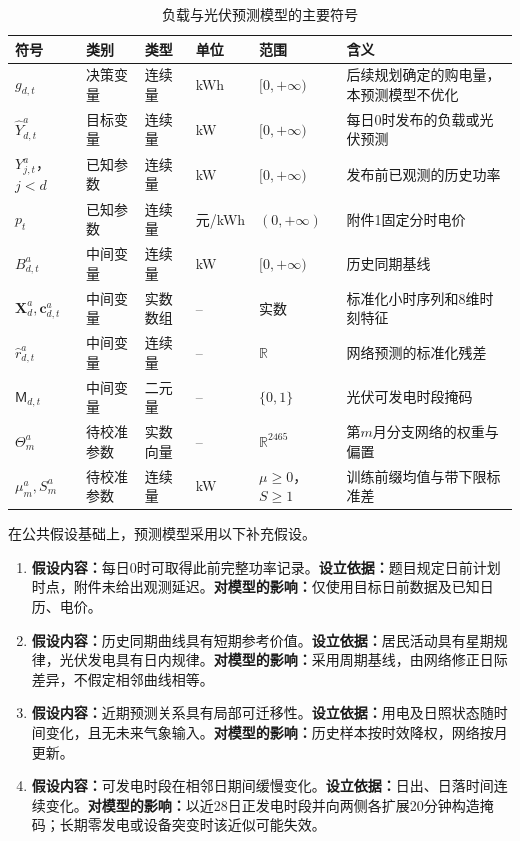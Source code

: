 \documentclass[withoutpreface,bwprint]{cumcmthesis}
\begin{document}
\begin{table}[H]
\centering\small
\caption{负载与光伏预测模型的主要符号}\label{tab:q2-pred-symbols}
\setlength{\tabcolsep}{3pt}
\renewcommand{\arraystretch}{1.12}
\begin{tabularx}{\textwidth}{p{2.3cm}p{1.65cm}p{1.45cm}p{1.1cm}p{1.8cm}X}
\toprule
符号 & 类别 & 类型 & 单位 & 范围 & 含义\\
\midrule
$g_{d,t}$ & 决策变量 & 连续量 & kWh & $[0,+\infty)$ & 后续规划确定的购电量，本预测模型不优化\\
$\widehat Y^a_{d,t}$ & 目标变量 & 连续量 & kW & $[0,+\infty)$ & 每日0时发布的负载或光伏预测\\
$Y^a_{j,t}$，$j<d$ & 已知参数 & 连续量 & kW & $[0,+\infty)$ & 发布前已观测的历史功率\\
$p_t$ & 已知参数 & 连续量 & 元/kWh & $(0,+\infty)$ & 附件1固定分时电价\\
$B^a_{d,t}$ & 中间变量 & 连续量 & kW & $[0,+\infty)$ & 历史同期基线\\
$\mathbf X_d^a,\mathbf c_{d,t}^a$ & 中间变量 & 实数数组 & -- & 实数 & 标准化小时序列和8维时刻特征\\
$\widehat r^a_{d,t}$ & 中间变量 & 连续量 & -- & $\mathbb R$ & 网络预测的标准化残差\\
$\mathsf M_{d,t}$ & 中间变量 & 二元量 & -- & $\{0,1\}$ & 光伏可发电时段掩码\\
$\Theta_m^a$ & 待校准参数 & 实数向量 & -- & $\mathbb R^{2465}$ & 第$m$月分支网络的权重与偏置\\
$\mu_m^a,S_m^a$ & 待校准参数 & 连续量 & kW & $\mu\geq0$，$S\geq1$ & 训练前缀均值与带下限标准差\\
\bottomrule
\end{tabularx}
\end{table}

在公共假设基础上，预测模型采用以下补充假设。
\begin{enumerate}[label=\textbf{假设\arabic*：},leftmargin=4.8em,itemsep=4pt]
\item \textbf{假设内容：}每日0时可取得此前完整功率记录。\textbf{设立依据：}题目规定日前计划时点，附件未给出观测延迟。\textbf{对模型的影响：}仅使用目标日前数据及已知日历、电价。
\item \textbf{假设内容：}历史同期曲线具有短期参考价值。\textbf{设立依据：}居民活动具有星期规律，光伏发电具有日内规律。\textbf{对模型的影响：}采用周期基线，由网络修正日际差异，不假定相邻曲线相等。
\item \textbf{假设内容：}近期预测关系具有局部可迁移性。\textbf{设立依据：}用电及日照状态随时间变化，且无未来气象输入。\textbf{对模型的影响：}历史样本按时效降权，网络按月更新。
\item \textbf{假设内容：}可发电时段在相邻日期间缓慢变化。\textbf{设立依据：}日出、日落时间连续变化。\textbf{对模型的影响：}以近28日正发电时段并向两侧各扩展20分钟构造掩码；长期零发电或设备突变时该近似可能失效。
\end{enumerate}
\end{document}
